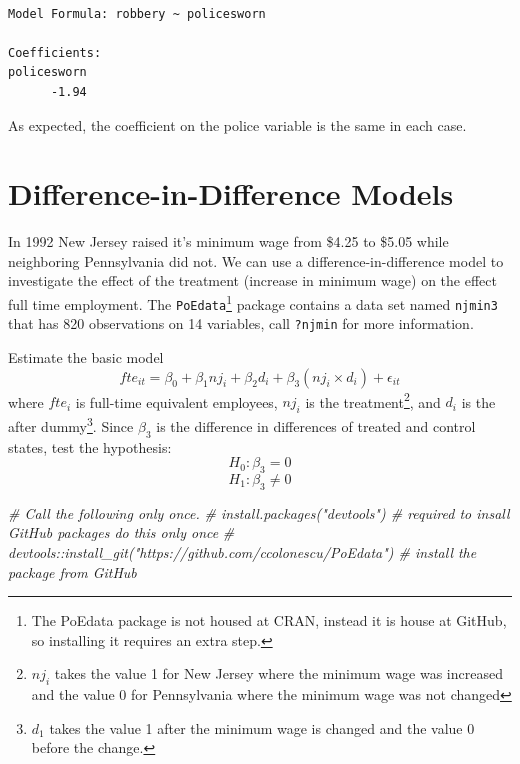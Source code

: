 \documentclass[]{book}
\newenvironment{Shaded}{\begin{snugshade}}{\end{snugshade}}
\newcommand{\CommentTok}[1]{\textcolor[rgb]{0.56,0.35,0.01}{\textit{#1}}}
\newcommand{\KeywordTok}[1]{\textcolor[rgb]{0.13,0.29,0.53}{\textbf{#1}}}
\newcommand{\NormalTok}[1]{#1}
\newcommand{\OperatorTok}[1]{\textcolor[rgb]{0.81,0.36,0.00}{\textbf{#1}}}
\newcommand{\StringTok}[1]{\textcolor[rgb]{0.31,0.60,0.02}{#1}}
\let\rmarkdownfootnote\footnote%
\def\footnote{\protect\rmarkdownfootnote}
\begin{document}
\begin{verbatim}

Model Formula: robbery ~ policesworn

Coefficients:
policesworn 
      -1.94 
\end{verbatim}

As expected, the coefficient on the police variable is the same in each case.

\hypertarget{difference-in-difference-models}{%
\section{Difference-in-Difference Models}\label{difference-in-difference-models}}

In 1992 New Jersey raised it's minimum wage from \$4.25 to \$5.05 while neighboring Pennsylvania did not. We can use a difference-in-difference model to investigate the effect of the treatment (increase in minimum wage) on the effect full time employment. The \texttt{PoEdata}\footnote{The PoEdata package is not housed at CRAN, instead it is house at GitHub, so installing it requires an extra step.} package contains a data set named \texttt{njmin3} that has 820 observations on 14 variables, call \texttt{?njmin} for more information.

Estimate the basic model \[fte_{it}=\beta_0+\beta_1nj_i+\beta_2d_i+\beta_3(nj_i\times d_i) + \epsilon_{it}\] where \(fte_i\) is full-time equivalent employees, \(nj_i\) is the treatment\footnote{\(nj_i\) takes the value 1 for New Jersey where the minimum wage was increased and the value 0 for Pennsylvania where the minimum wage was not changed}, and \(d_i\) is the after dummy\footnote{\(d_1\) takes the value 1 after the minimum wage is changed and the value 0 before the change.}. Since \(\beta_3\) is the difference in differences of treated and control states, test the hypothesis: \[H_0:\beta_3=0\]\[H_1:\beta_3\ne0\]

\begin{Shaded}
\begin{Highlighting}[]
\CommentTok{# Call the following only once.}
\CommentTok{# install.packages("devtools") # required to insall GitHub packages do this only once}
\CommentTok{# devtools::install_git("https://github.com/ccolonescu/PoEdata") # install the package from GitHub }
\end{Highlighting}
\end{Shaded}

\begin{Shaded}
\end{Shaded}
\end{document}
